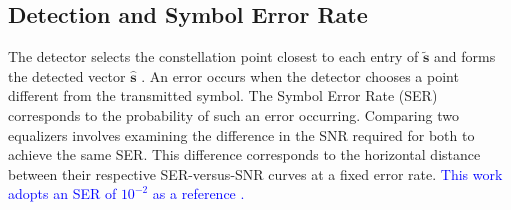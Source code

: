 \subsection{Detection and Symbol Error Rate}\label{subsubsec:ser}

The detector selects the constellation point closest to each entry of $\tilde{\mathbf s}$ and forms the detected vector $\hat{\mathbf s}$ \cite{zhao2025jsac}. An error occurs when the detector chooses a point different from the transmitted symbol. The Symbol Error Rate (SER) corresponds to the probability of such an error occurring. Comparing two equalizers involves examining the difference in the SNR required for both to achieve the same SER. This difference corresponds to the horizontal distance between their respective SER-versus-SNR curves at a fixed error rate. \textcolor{blue}{This work adopts an SER of $10^{-2}$ as a reference \cite{tse-viswanath,wang2021tlbdinsa}.}
